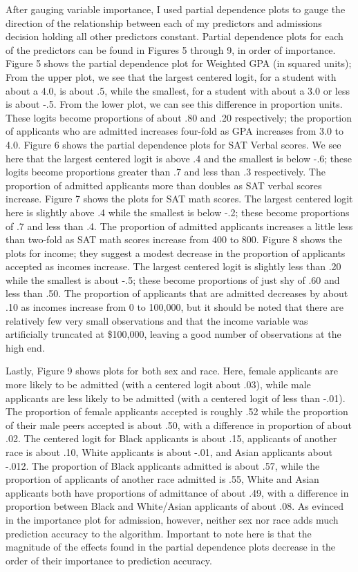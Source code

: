 \documentclass[titlepage]{article}   	%
\begin{document}
After gauging variable importance, I used partial dependence plots to gauge the direction of the relationship between each of my predictors and admissions decision holding all other predictors constant. Partial dependence plots for each of the predictors can be found in Figures 5 through 9, in order of importance.  Figure 5 shows the partial dependence plot for Weighted GPA (in squared units); From the upper plot, we see that the largest centered logit, for a student with about a 4.0, is about .5, while the smallest, for a student with about a 3.0 or less is about -.5. From the lower plot, we can see this difference in proportion units. These logits become proportions of about .80 and .20 respectively; the proportion of applicants who are admitted increases four-fold as GPA increases from 3.0 to 4.0. Figure 6 shows the partial dependence plots for SAT Verbal scores. We see here that the largest centered logit is above .4 and the smallest is below -.6; these logits become proportions greater than .7 and less than .3 respectively. The proportion of admitted applicants more than doubles as SAT verbal scores increase. Figure 7 shows the plots for SAT math scores. The largest centered logit here is slightly above .4 while the smallest is below -.2; these become proportions of .7 and less than .4. The proportion of admitted applicants increases a little less than two-fold as SAT math scores increase from 400 to 800. Figure 8 shows the plots for income; they suggest a modest decrease in the proportion of applicants accepted as incomes increase. The largest centered logit is slightly less than .20 while the smallest is about -.5; these become proportions of just shy of .60 and less than .50. The proportion of applicants that are admitted decreases by about .10 as incomes increase from 0 to 100,000, but it should be noted that there are relatively few very small observations and that the income variable was artificially truncated at \$100,000, leaving a good number of observations at the high end.

Lastly, Figure 9 shows plots for both sex and race. Here, female applicants are more likely to be admitted (with a centered logit about .03), while male applicants are less likely to be admitted (with a centered logit of less than -.01). The proportion of female applicants accepted is roughly .52 while the proportion of their male peers accepted is about .50, with a difference in proportion of about .02. The centered logit for Black applicants is about .15, applicants of another race is about .10, White applicants is about -.01, and Asian applicants about -.012. The proportion of Black applicants admitted is about .57, while the proportion of applicants of another race admitted is .55, White and Asian applicants both have proportions of admittance of about .49, with a difference in proportion between Black and White/Asian applicants of about .08. As evinced in the importance plot for admission, however, neither sex nor race adds much prediction accuracy to the algorithm. Important to note here is that the magnitude of the effects found in the partial dependence plots decrease in the order of their importance to prediction accuracy.
\end{document}
